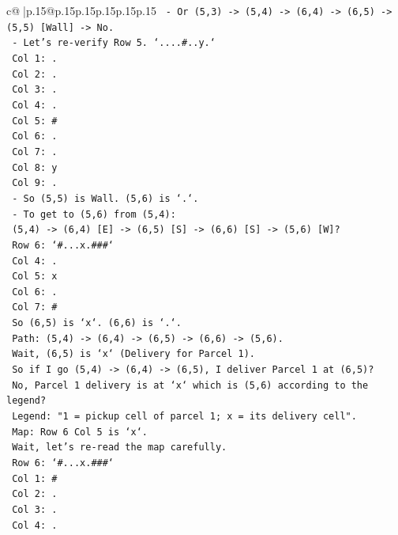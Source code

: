 \documentclass{article}
\begin{document}
{\begin{supertabular}{c@{$\;$}|p{.15\linewidth}@{}p{.15\linewidth}p{.15\linewidth}p{.15\linewidth}p{.15\linewidth}p{.15\linewidth}}
{{{\texttt{  {-} Or (5,3) {-}> (5,4) {-}> (6,4) {-}> (6,5) {-}> (5,5) {[}Wall{]} {-}> No.} \\
\texttt{  {-} Let's re{-}verify Row 5. `....\#..y.`} \\
\texttt{    Col 1: .} \\
\texttt{    Col 2: .} \\
\texttt{    Col 3: .} \\
\texttt{    Col 4: .} \\
\texttt{    Col 5: \#} \\
\texttt{    Col 6: .} \\
\texttt{    Col 7: .} \\
\texttt{    Col 8: y} \\
\texttt{    Col 9: .} \\
\texttt{  {-} So (5,5) is Wall. (5,6) is `.`.} \\
\texttt{  {-} To get to (5,6) from (5,4):} \\
\texttt{    (5,4) {-}> (6,4) {[}E{]} {-}> (6,5) {[}S{]} {-}> (6,6) {[}S{]} {-}> (5,6) {[}W{]}?} \\
\texttt{    Row 6: `\#...x.\#\#\#`} \\
\texttt{    Col 4: .} \\
\texttt{    Col 5: x} \\
\texttt{    Col 6: .} \\
\texttt{    Col 7: \#} \\
\texttt{    So (6,5) is `x`. (6,6) is `.`.} \\
\texttt{    Path: (5,4) {-}> (6,4) {-}> (6,5) {-}> (6,6) {-}> (5,6).} \\
\texttt{    Wait, (6,5) is `x` (Delivery for Parcel 1).} \\
\texttt{    So if I go (5,4) {-}> (6,4) {-}> (6,5), I deliver Parcel 1 at (6,5)?} \\
\texttt{    No, Parcel 1 delivery is at `x` which is (5,6) according to the legend?} \\
\texttt{    Legend: "1 = pickup cell of parcel 1; x = its delivery cell".} \\
\texttt{    Map: Row 6 Col 5 is `x`.} \\
\texttt{    Wait, let's re{-}read the map carefully.} \\
\texttt{    Row 6: `\#...x.\#\#\#`} \\
\texttt{    Col 1: \#} \\
\texttt{    Col 2: .} \\
\texttt{    Col 3: .} \\
\texttt{    Col 4: .} \\
}}}
\end{supertabular}}
\end{document}
